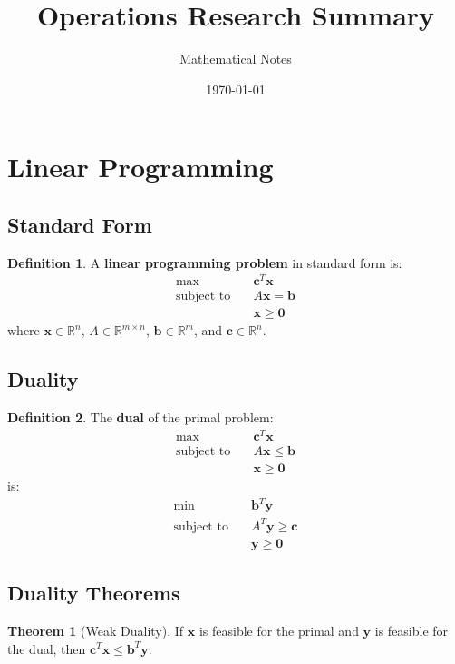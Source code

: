 \documentclass[11pt]{article}
\title{Operations Research Summary}
\author{Mathematical Notes}
\date{\today}
\theoremstyle{definition}
\newtheorem{definition}{Definition}[section]
\newtheorem{theorem}{Theorem}[section]
\begin{document}
\maketitle

\tableofcontents
\newpage

\section{Linear Programming}

\subsection{Standard Form}
\begin{definition}
A \textbf{linear programming problem} in standard form is:
\begin{align}
\max \quad & \mathbf{c}^T \mathbf{x} \\
\text{subject to} \quad & A\mathbf{x} = \mathbf{b} \\
& \mathbf{x} \geq \mathbf{0}
\end{align}
where $\mathbf{x} \in \mathbb{R}^n$, $A \in \mathbb{R}^{m \times n}$, $\mathbf{b} \in \mathbb{R}^m$, and $\mathbf{c} \in \mathbb{R}^n$.
\end{definition}

\subsection{Duality}
\begin{definition}
The \textbf{dual} of the primal problem:
\begin{align}
\max \quad & \mathbf{c}^T \mathbf{x} \\
\text{subject to} \quad & A\mathbf{x} \leq \mathbf{b} \\
& \mathbf{x} \geq \mathbf{0}
\end{align}
is:
\begin{align}
\min \quad & \mathbf{b}^T \mathbf{y} \\
\text{subject to} \quad & A^T \mathbf{y} \geq \mathbf{c} \\
& \mathbf{y} \geq \mathbf{0}
\end{align}
\end{definition}

\subsection{Duality Theorems}
\begin{theorem}[Weak Duality]
If $\mathbf{x}$ is feasible for the primal and $\mathbf{y}$ is feasible for the dual, then $\mathbf{c}^T \mathbf{x} \leq \mathbf{b}^T \mathbf{y}$.
\end{theorem}
\end{document}
